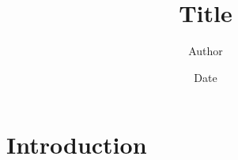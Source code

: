 \documentclass{article}
\title{Title}
\author{Author}
\date{Date}
\begin{document}
\maketitle

\section{Introduction}
\end{document}
